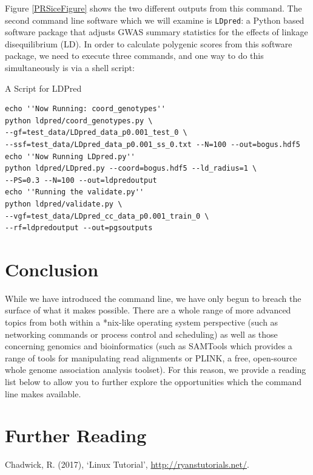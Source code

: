 \documentclass[11pt]{article}
\begin{document}
Figure \ref{PRSiceFigure} shows the two different outputs from this command. The second command line software which we will examine is \texttt{LDpred}: a Python based software package that adjusts GWAS summary statistics for the effects of linkage disequilibrium (LD). In order to calculate polygenic scores from this software package, we need to execute three commands, and one way to do this simultaneously is via a shell script:\\


\begin{listing}[H]
\caption{A Script for LDPred}\vspace{-0.1in}
\begin{verbatim}
echo ''Now Running: coord_genotypes''
python ldpred/coord_genotypes.py \ 
--gf=test_data/LDpred_data_p0.001_test_0 \
--ssf=test_data/LDpred_data_p0.001_ss_0.txt --N=100 --out=bogus.hdf5
echo ''Now Running LDpred.py''
python ldpred/LDpred.py --coord=bogus.hdf5 --ld_radius=1 \
--PS=0.3 --N=100 --out=ldpredoutput
echo ''Running the validate.py''
python ldpred/validate.py \
--vgf=test_data/LDpred_cc_data_p0.001_train_0 \
--rf=ldpredoutput --out=pgsoutputs
\end{verbatim}
\end{listing}
\section{Conclusion} 

While we have introduced the command line, we have only begun to breach the surface of what it makes possible. There are a whole range of more advanced topics from both within a *nix-like operating system perspective (such as networking commands or process control and scheduling) as well as those concerning genomics and bioinformatics (such as SAMTools which provides a range of tools for manipulating read alignments or PLINK,  a free, open-source whole genome association analysis toolset). For this reason, we provide a reading list below to allow you to further explore the opportunities which the command line makes available.

\section{Further Reading}


\noindent
Chadwick, R. (2017), `Linux Tutorial', \url{http://ryanstutorials.net/}.\\
\end{document}
